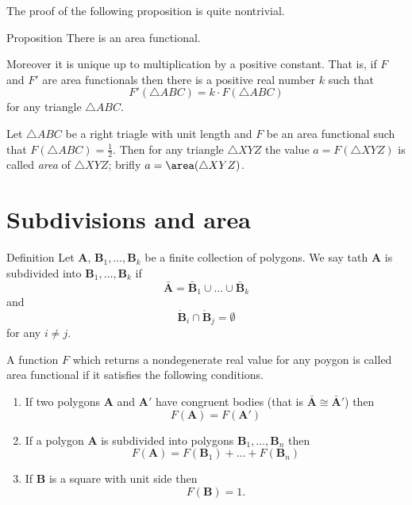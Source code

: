 The proof of the following proposition is quite nontrivial.

\begin{thm}{Proposition}
There is an area functional. 

Moreover it is unique up to multiplication by a positive constant. 
That is, if $F$ and $F'$ are area functionals then there is a positive real number $k$ such that 
\[F'(\triangle ABC)=k\cdot F(\triangle ABC)\]
for any triangle $\triangle ABC$.
\end{thm}

Let $\triangle ABC$ be a right triagle with unit length
and $F$ be an area functional such that $F(\triangle ABC)=\tfrac12$.
Then for any triangle $\triangle XYZ$ the value $a=F(\triangle XYZ)$ is called \emph{area} of $\triangle XYZ$;
brifly $a=\area(\triangle XYZ)$.















\section*{Subdivisions and area}

\begin{thm}{Definition}
Let $\bm{A}$, $\bm{B}_1,\dots,\bm{B}_k$
be a finite collection of polygons.
We say tath $\bm{A}$ 
is subdivided into $\bm{B}_1,\dots,\bm{B}_k$
if 
\[\bar{\bm{A}}=\bar{\bm{B}}_1\cup\dots\cup\bar{\bm{B}}_k\]
and 
\[\mathring{\bm{B}}_i\cap\mathring{\bm{B}}_j=\emptyset\]
for any $i\ne j$.
\end{thm}

A function $F$ which returns a nondegenerate real value for any poygon 
is called area functional if it satisfies the following conditions.

\begin{enumerate}
\item If  two polygons $\bm{A}$ and $\bm{A}'$ have congruent bodies (that is $\bar{\bm{A}}\cong \bar{\bm{A}}'$)
then 
\[F(\bm{A})=F(\bm{A}')\]
\item If a polygon $\bm{A}$ is subdivided into polygons $\bm{B}_1, \dots,\bm{B}_n$
then 
\[F(\bm{A})=F(\bm{B}_1)+\dots+F(\bm{B}_n)\]
\item If $\bm{B}$ is a square with unit side then 
\[F(\bm{B})=1.\]
\end{enumerate}

